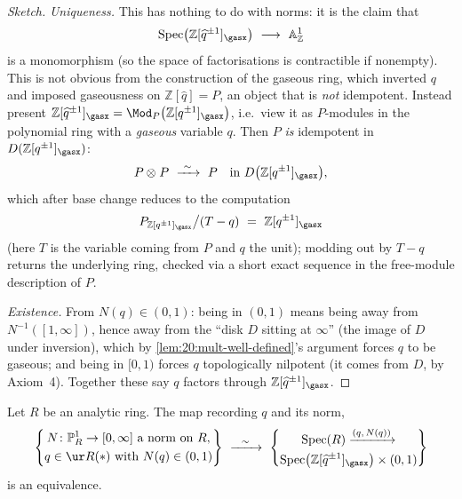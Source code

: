 \begin{proof}[Sketch]
\emph{Uniqueness.} This has nothing to do with norms: it is the claim that
\begin{equation*}
\mathrm{Spec}\bigl(\mathbb Z[\widehat q^{\pm1}]_\gasx\bigr)\ \longrightarrow\
\mathbb A^1_{\mathbb Z}
\end{equation*}
is a monomorphism (so the space of factorisations is contractible if nonempty).
This is not obvious from the construction of the gaseous ring, which inverted $q$
and imposed gaseousness on $\mathbb Z[\widehat q]=P$, an object that is
\emph{not} idempotent. Instead present
$\mathbb Z[\widehat q^{\pm1}]_\gasx=\Mod_P\bigl(\mathbb Z[q^{\pm1}]_\gasx\bigr)$,
i.e.\ view it as $P$-modules in the polynomial ring with a \emph{gaseous}
variable $q$. Then $P$ \emph{is} idempotent in $D(\mathbb Z[q^{\pm1}]_\gasx)$:
\begin{equation*}
P\otimes^{}_{}P\ \xrightarrow{\ \sim\ }\ P
\quad\text{in }D\bigl(\mathbb Z[q^{\pm1}]_\gasx\bigr),
\end{equation*}
which after base change reduces to the computation
\begin{equation*}
P_{\mathbb Z[q^{\pm1}]_\gasx}\big/(T-q)\ =\ \mathbb Z[q^{\pm1}]_\gasx
\end{equation*}
(here $T$ is the variable coming from $P$ and $q$ the unit); modding out by
$T-q$ returns the underlying ring, checked via a short exact sequence in the
free-module description of $P$.

\emph{Existence.} From $N(q)\in(0,1)$: being in $(0,1)$ means being away from
$N^{-1}([1,\infty])$, hence away from the ``disk $D$ sitting at $\infty$''
(the image of $D$ under inversion), which by \cref{lem:20:mult-well-defined}'s
argument forces $q$ to be gaseous; and being in $[0,1)$ forces $q$ topologically
nilpotent (it comes from $D$, by Axiom~4). Together these say $q$ factors through
$\mathbb Z[\widehat q^{\pm1}]_\gasx$. \qedhere
\end{proof}

\begin{theorem}
\label{thm:20:classification}
Let $R$ be an analytic ring. The map recording $q$ and its norm,
\begin{equation}
\label{eq:20:classification}
\left\{\begin{gathered}N\colon\mathbb P^1_R\to[0,\infty]\ \text{a norm on }R,\\
q\in\ur R(\ast)\ \text{with}\ N(q)\in(0,1)\end{gathered}\right\}
\ \xrightarrow{\ \ \sim\ \ }\
\left\{\begin{gathered}\mathrm{Spec}(R)\xrightarrow{(q,\,N(q))}\\
\mathrm{Spec}\bigl(\mathbb Z[\widehat q^{\pm1}]_\gasx\bigr)\times(0,1)\end{gathered}\right\}
\end{equation}
is an equivalence.
\end{theorem}

